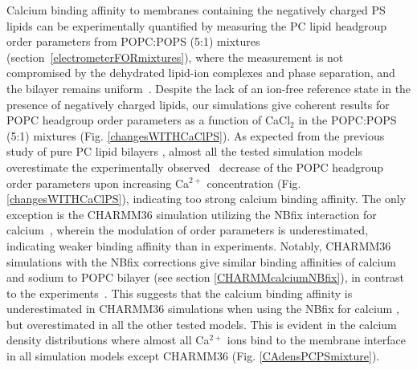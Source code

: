 \documentclass[aps,prl,superscriptaddress,twocolumn]{revtex4}
\begin{document}
Calcium binding affinity to membranes containing the negatively charged PS lipids can be
experimentally quantified by measuring the PC lipid headgroup order parameters
from POPC:POPS (5:1) mixtures (section~\ref{electrometerFORmixtures}),
where the measurement is not compromised by the dehydrated lipid-ion complexes and phase separation, and the bilayer remains uniform~\cite{feigenson86,mattai89,roux90,roux91}.
Despite the lack of an ion-free reference state
in the presence of negatively charged lipids, our simulations give
coherent results for POPC headgroup order parameters as a function of
CaCl$_2$ in the POPC:POPS (5:1) mixtures (Fig. \ref{changesWITHCaClPS}).
As expected from the previous study of pure PC lipid
bilayers \cite{catte16}, almost all the tested simulation models overestimate the
experimentally observed~\cite{roux90} decrease of the POPC headgroup order parameters upon increasing Ca$^{2+}$ concentration (Fig. \ref{changesWITHCaClPS}),
indicating too strong calcium binding affinity.
The only exception is the CHARMM36 simulation utilizing the NBfix
interaction for calcium~\cite{kim16}, wherein the modulation of order parameters is underestimated, 
indicating weaker binding affinity than in experiments.
Notably, CHARMM36 simulations with the NBfix corrections \cite{venable13,kim16} give similar binding affinities of
calcium and sodium to POPC bilayer (see section \ref{CHARMMcalciumNBfix}), in contrast to the experiments~\cite{cevc90,akutsu81,altenbach84}. This suggests that the calcium binding affinity
is underestimated in CHARMM36 simulations when using the NBfix for calcium \cite{kim16}, but overestimated 
in all the other tested models. This is evident in the calcium density distributions where almost all Ca$^{2+}$ ions bind to the membrane interface in all simulation models except CHARMM36 (Fig. \ref{CAdensPCPSmixture}).
\end{document}
